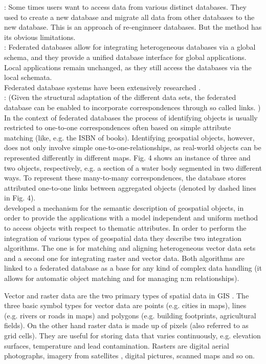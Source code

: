 \documentclass[12pt,a4paper]{report}
\newcommand{\acr}{\MakeUppercase}
\begin{document}
	\citep{Jian}: Some times users want to access data from various distinct databases. They used to create a new database and migrate all data from other databases to the new database. This is an approach of re-enginneer databases. But the method has its obvious limitations.
	\\

	\citep{Butenuth}: Federated databases allow for integrating heterogeneous databases via a global schema, and they provide a unified database interface for global applications. Local applications remain unchanged, as they still access the databases via the local schemata.
	\\

	Federated database systems have been extensively researched \citep{Litwin, Sheth}.
	\\

	\citep{Butenuth}: (Given the structural adaptation of the different data sets, the federated database can be enabled to incorporate correspondences through so called links. ) In the context of federated databases the process of identifying objects is usually restricted to one-to-one correspondences often based on simple attribute matching (like, e.g. the ISBN of books). Identifying geospatial objects, however, does not only involve simple one-to-one-relationships, as real-world objects can be represented differently in different maps. Fig. 4 shows an instance of three and two objects, respectively, e.g. a section of a water body segmented in two different ways. To represent these many-to-many correspondences, the database stores attributed one-to-one links between aggregated objects (denoted by dashed lines in Fig. 4).
	\\

	\citet{Butenuth} developed a mechanism for the semantic description of 
	geospatial objects, in order to provide the applications with a model 
	independent and uniform method to access objects with respect to thematic 
	attributes. In order to perform the integration of various types of 
	geospatial data they describe two integration algorithms. The one is for 
	matching and aligning heterogeneous vector data sets and a second one for 
	integrating raster and vector data. Both algorithms are linked to a 
	federated database as a base for any kind of complex data handling (it 
	allows for automatic object matching and for managing n:m relationships).
	\par
	Vector and raster data are the two primary types of spatial data in 
	\acr{gis} \citep{gisGeography}. The three basic symbol types for vector 
	data are points (e.g. cities in maps), lines (e.g. rivers or roads in maps) 
	and polygons (e.g. building footprints, agricultural fields). On the other 
	hand raster data is made up of pixels (also referred to as grid cells). 
	They are useful for storing data that varies continuously, e.g. elevation 
	surfaces, temperature and lead contamination. Rasters are digital aerial 
	photographs, imagery from satellites \citep{Butenuth}, digital pictures, 
	scanned maps and so on.
	\\
\end{document}
